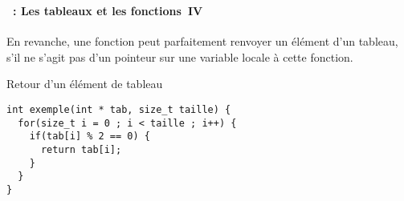 \begin{frame}[containsverbatim]
  \frametitle{\secname}
  \framesubtitle{\subsecname~: Les tableaux et les fonctions~IV}

  En revanche, une fonction peut parfaitement renvoyer un élément d'un tableau, s'il ne s'agit pas d'un pointeur sur une variable locale à 
  cette fonction.
  
  \begin{exampleblock}{Retour d'un élément de tableau}
    \begin{verbatim}
int exemple(int * tab, size_t taille) {
  for(size_t i = 0 ; i < taille ; i++) {
    if(tab[i] % 2 == 0) {
      return tab[i];
    }
  } 
}\end{verbatim}
  \end{exampleblock}
\end{frame}

